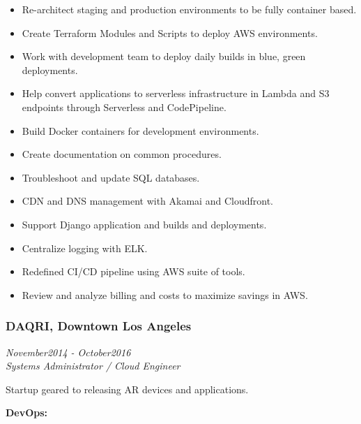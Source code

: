 \documentclass[]{article}
\providecommand{\tightlist}{%
  \setlength{\itemsep}{0pt}\setlength{\parskip}{0pt}}
\begin{document}
\begin{itemize}
\tightlist
\item
  Re-architect staging and production environments to be fully container
  based.
\item
  Create Terraform Modules and Scripts to deploy AWS environments.
\item
  Work with development team to deploy daily builds in blue, green
  deployments.
\item
  Help convert applications to serverless infrastructure in Lambda and
  S3 endpoints through Serverless and CodePipeline.
\item
  Build Docker containers for development environments.
\item
  Create documentation on common procedures.
\item
  Troubleshoot and update SQL databases.
\item
  CDN and DNS management with Akamai and Cloudfront.
\item
  Support Django application and builds and deployments.
\item
  Centralize logging with ELK.
\item
  Redefined CI/CD pipeline using AWS suite of tools.
\item
  Review and analyze billing and costs to maximize savings in AWS.
\end{itemize}

\hypertarget{daqri-downtown-los-angeles}{%
\subsubsection{DAQRI, Downtown Los
Angeles}\label{daqri-downtown-los-angeles}}

\emph{November2014 - October2016}\\
\emph{Systems Administrator / Cloud Engineer}

Startup geared to releasing AR devices and applications.

\textbf{DevOps:}
\end{document}
